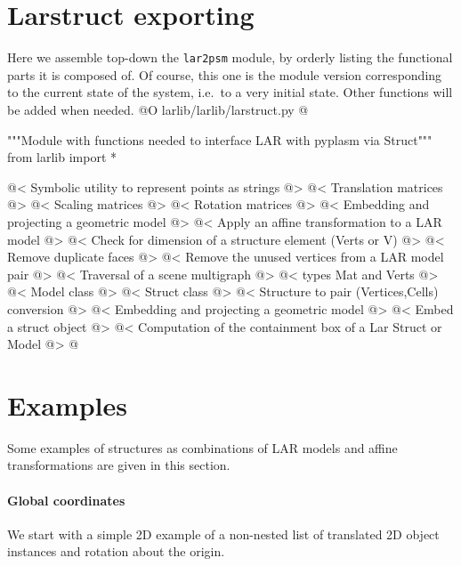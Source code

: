 \documentclass[11pt,oneside]{article}    %
\begin{document}
\section{Larstruct exporting}
\label{sec:larstruct}
Here we assemble top-down the \texttt{lar2psm} module, by orderly listing the functional parts it is composed of. Of course, this one is the module version corresponding to the current state of the system, i.e.~to a very initial state. Other functions will be added when needed.
@O larlib/larlib/larstruct.py
@{"""Module with functions needed to interface LAR with pyplasm via Struct"""
from larlib import *

@< Symbolic utility to represent points as strings @>
@< Translation matrices @>
@< Scaling matrices @>
@< Rotation matrices @>
@< Embedding and projecting a geometric model @>
@< Apply an affine transformation to a LAR model @>
@< Check for dimension of a structure element (Verts or V) @>
@< Remove duplicate faces @>
@< Remove the unused vertices from a LAR model pair @>
@< Traversal of a scene multigraph @>
@< types Mat and Verts @>
@< Model class @>
@< Struct class @>
@< Structure to pair (Vertices,Cells) conversion @>
@< Embedding and projecting a geometric model @>
@< Embed a struct object @>
@< Computation of the containment box of a Lar Struct or Model @>
@}

\section{Examples}
Some examples of structures as combinations of LAR models and affine transformations are given in this section. 

\paragraph{Global coordinates}
We start with a simple 2D example of a non-nested list of translated 2D object instances and rotation about the origin.
\end{document}
